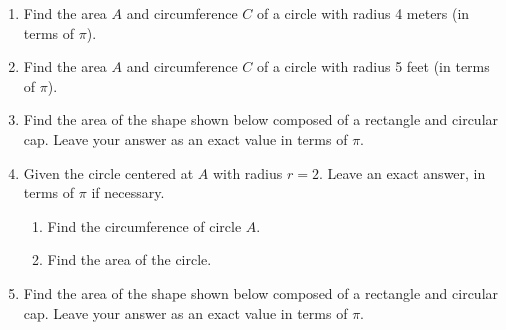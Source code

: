 \begin{enumerate}
\item Find the area $A$ and circumference $C$ of a circle with radius 4 meters (in terms of $\pi$). 

\item Find the area $A$ and circumference $C$ of a circle with radius 5 feet (in terms of $\pi$). 
  
\newpage
    
\item Find the area of the shape shown below composed of a rectangle and circular cap. Leave your answer as an exact value in terms of $\pi$.
\begin{flushright}
\end{flushright}

\item Given the circle centered at $A$ with radius $r=2$. Leave an exact answer, in terms of $\pi$ if necessary.
  \begin{multicols}{2}
    \begin{enumerate}
      \item Find the circumference of circle $A$. %
      \item Find the area of the circle.\vspace{2cm}
    \end{enumerate}
    \begin{flushright}
  \end{flushright}
  \end{multicols}

\item Find the area of the shape shown below composed of a rectangle and circular cap. Leave your answer as an exact value in terms of $\pi$.
\begin{flushright}
\end{flushright}


\end{enumerate}
